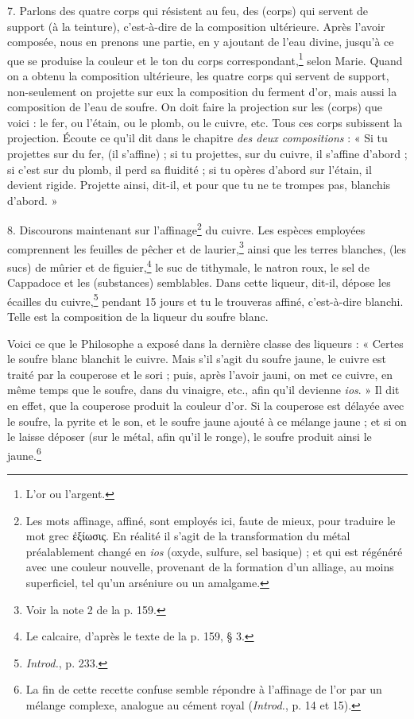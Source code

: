 \documentclass[landscape, a4paper, 11pt, oneside, polutonikogreek, french]{article}
\begin{document}
7. Parlons des quatre corps qui résistent au feu, des (corps) qui servent de support (à la teinture), c'est-à-dire de la composition ultérieure. Après l'avoir composée, nous en prenons une partie, en y ajoutant de l'eau divine, jusqu'à ce que se produise la couleur et le ton du corps correspondant,\footnote{L'or ou l'argent.} selon Marie. Quand on a obtenu la composition ultérieure, les quatre corps qui servent de support, non-seulement on projette sur eux la composition du ferment d'or, mais aussi la composition de l'eau de soufre. On doit faire la projection sur les (corps) que voici : le fer, ou l'étain, ou le plomb, ou le cuivre, etc. Tous ces corps subissent la projection. Écoute ce qu'il dit dans le chapitre \emph{des deux compositions} : « Si tu projettes sur du fer, (il s'affine) ; si tu projettes, sur du cuivre, il s'affine d'abord ; si c'est sur du plomb, il perd sa fluidité ; si tu opères d'abord sur l'étain, il devient rigide. Projette ainsi, dit-il, et pour que tu ne te trompes pas, blanchis d'abord. »

8. Discourons maintenant sur l'affinage\footnote{Les mots affinage, affiné, sont employés ici, faute de mieux, pour traduire le mot grec ἐξίωσις. En réalité il s'agit de la transformation du métal préalablement changé en \emph{ios} (oxyde, sulfure, sel basique) ; et qui est régénéré avec une couleur nouvelle, provenant de la formation d'un alliage, au moins superficiel, tel qu'un arséniure ou un amalgame.} du cuivre. Les espèces employées comprennent les feuilles de pêcher et de laurier,\footnote{Voir la note 2 de la p. 159.} ainsi que les terres blanches, (les sucs) de mûrier et de figuier,\footnote{Le calcaire, d'après le texte de la p. 159, § 3.} le suc de tithymale, le natron roux, le sel de Cappadoce et les (substances) semblables. Dans cette liqueur, dit-il, dépose les écailles du cuivre,\footnote{\emph{Introd.}, p. 233.} pendant 15 jours et tu le trouveras affiné, c'est-à-dire blanchi. Telle est la composition de la liqueur du soufre blanc.

Voici ce que le Philosophe a exposé dans la dernière classe des liqueurs : « Certes le soufre blanc blanchit le cuivre. Mais s'il s'agit du soufre jaune, le cuivre est traité par la couperose et le sori ; puis, après l'avoir jauni, on met ce cuivre, en même temps que le soufre, dans du vinaigre, etc., afin qu'il devienne \emph{ios}. » Il dit en effet, que la couperose produit la couleur d'or. Si la couperose est délayée avec le soufre, la pyrite et le son, et le soufre jaune ajouté à ce mélange jaune ; et si on le laisse déposer (sur le métal, afin qu'il le ronge), le soufre produit ainsi le jaune.\footnote{La fin de cette recette confuse semble répondre à l'affinage de l'or par un mélange complexe, analogue au cément royal (\emph{Introd.}, p. 14 et 15).}
\end{document}
